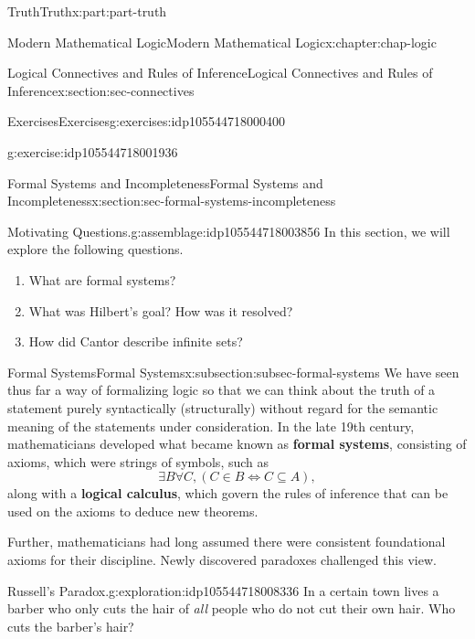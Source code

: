 \documentclass[oneside,10pt,]{book}
\newcommand{\terminology}[1]{\textbf{#1}}
\numberwithin{equation}{section}
\begin{document}
\begin{partptx}{Truth}{}{Truth}{}{}{x:part:part-truth}
\begin{chapterptx}{Modern Mathematical Logic}{}{Modern Mathematical Logic}{}{}{x:chapter:chap-logic}
\begin{sectionptx}{Logical Connectives and Rules of Inference}{}{Logical Connectives and Rules of Inference}{}{}{x:section:sec-connectives}
\begin{exercises-subsection-numberless}{Exercises}{}{Exercises}{}{}{g:exercises:idp105544718000400}
\begin{divisionexercise}{2}{}{}{g:exercise:idp105544718001936}%
%
\end{divisionexercise}%
\end{exercises-subsection-numberless}
\end{sectionptx}
%
%
\typeout{************************************************}
\typeout{************************************************}
%
\begin{sectionptx}{Formal Systems and Incompleteness}{}{Formal Systems and Incompleteness}{}{}{x:section:sec-formal-systems-incompleteness}
\begin{assemblage}{Motivating Questions.}{g:assemblage:idp105544718003856}%
In this section, we will explore the following questions. %
\begin{enumerate}
\item{}What are formal systems?%
\item{}What was Hilbert's goal? How was it resolved?%
\item{}How did Cantor describe infinite sets?%
\end{enumerate}
%
\end{assemblage}
%
%
\typeout{************************************************}
\typeout{************************************************}
%
\begin{subsectionptx}{Formal Systems}{}{Formal Systems}{}{}{x:subsection:subsec-formal-systems}
We have seen thus far a way of formalizing logic so that we can think about the truth of a statement purely syntactically (structurally) without regard for the semantic meaning of the statements under consideration. In the late 19th century, mathematicians developed what became known as \terminology{formal systems}, consisting of axioms, which were strings of symbols, such as%
\begin{equation*}
\exists B \forall C, (C\in B \Leftrightarrow C\subseteq A),
\end{equation*}
along with a \terminology{logical calculus}, which govern the rules of inference that can be used on the axioms to deduce new theorems.%
\par
Further, mathematicians had long assumed there were consistent foundational axioms for their discipline. Newly discovered paradoxes challenged this view.%
\begin{exploration}{Russell's Paradox.}{g:exploration:idp105544718008336}%
In a certain town lives a barber who only cuts the hair of \emph{all} people who do not cut their own hair. Who cuts the barber's hair?%

\end{exploration}
\end{subsectionptx}
\end{sectionptx}
\end{chapterptx}
\end{partptx}
\end{document}
